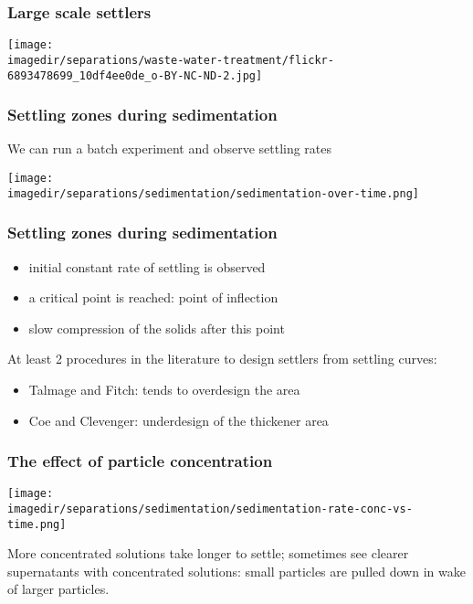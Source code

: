\begin{frame}\frametitle{Large scale settlers}
	\centerline{\texttt{[image: \\imagedir/separations/waste-water-treatment/flickr-6893478699\_10df4ee0de\_o-BY-NC-ND-2.jpg]}}
\end{frame}

\begin{frame}\frametitle{Settling zones during sedimentation}
	We can run a batch experiment and observe settling rates
	\begin{center}
		\texttt{[image: \\imagedir/separations/sedimentation/sedimentation-over-time.png]}
	\end{center}
\end{frame}

\begin{frame}\frametitle{Settling zones during sedimentation}
	\begin{itemize}
		\item	initial constant rate of settling is observed
		\item	a critical point is reached: point of inflection
		\item	slow compression of the solids after this point
	\end{itemize}
	\vspace{12pt}
	At least 2 procedures in the literature to design settlers from settling curves:
	\begin{itemize}
		\item	Talmage and Fitch: tends to overdesign the area
		\item	Coe and Clevenger: underdesign of the thickener area
	\end{itemize}

	\vspace{12pt}
	{\color{myGreen}{In practice: we will rely on outside consultants and civil engineers, most likely, to size and design the unit. Else see the references at end for more details.}}
\end{frame}

\begin{frame}\frametitle{The effect of particle concentration}
	\begin{center}
		\texttt{[image: \\imagedir/separations/sedimentation/sedimentation-rate-conc-vs-time.png]}
	\end{center}

	More concentrated solutions take longer to settle; sometimes see clearer supernatants with concentrated solutions: small particles are pulled down in wake of larger particles.
\end{frame}

